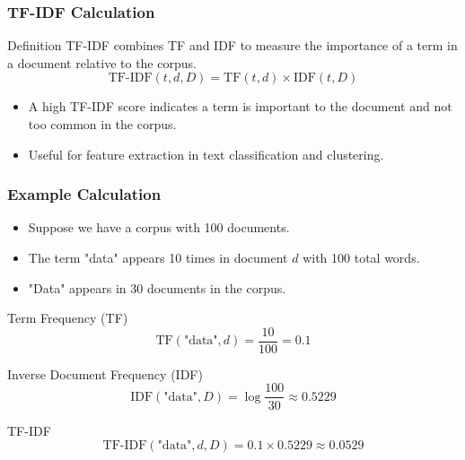 \documentclass{beamer}
\begin{document}
\begin{frame}
    \frametitle{TF-IDF Calculation}
    \begin{block}{Definition}
        TF-IDF combines TF and IDF to measure the importance of a term in a document relative to the corpus.
        \[
        \text{TF-IDF}(t, d, D) = \text{TF}(t, d) \times \text{IDF}(t, D)
        \]
    \end{block}
    \begin{itemize}
        \item A high TF-IDF score indicates a term is important to the document and not too common in the corpus.
        \item Useful for feature extraction in text classification and clustering.
    \end{itemize}
\end{frame}

\begin{frame}
    \frametitle{Example Calculation}
    \begin{itemize}
        \item Suppose we have a corpus with 100 documents.
        \item The term "data" appears 10 times in document \( d \) with 100 total words.
        \item "Data" appears in 30 documents in the corpus.
    \end{itemize}
    \begin{block}{Term Frequency (TF)}
        \[
        \text{TF}(\text{"data"}, d) = \frac{10}{100} = 0.1
        \]
        \end{block}
    \begin{block}{Inverse Document Frequency (IDF)}
        \[
        \text{IDF}(\text{"data"}, D) = \log \frac{100}{30} \approx 0.5229
        \]
        \end{block}
    \begin{block}{TF-IDF}
        \[
        \text{TF-IDF}(\text{"data"}, d, D) = 0.1 \times 0.5229 \approx 0.0529
        \]
        \end{block}
\end{frame}
\end{document}
